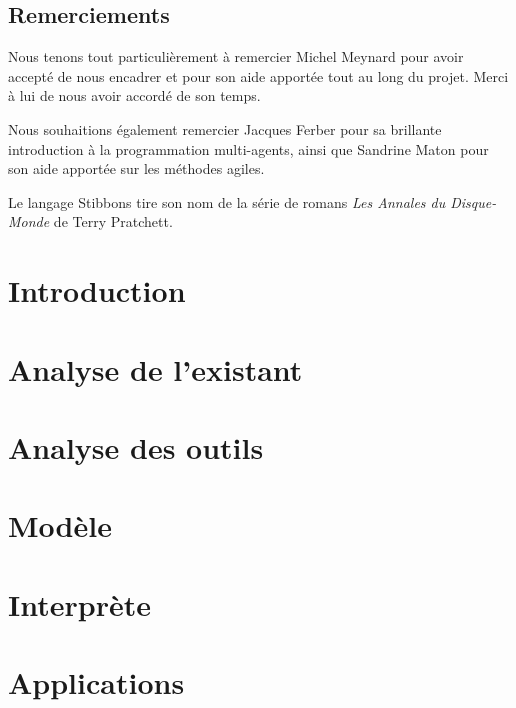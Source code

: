 \documentclass[a4paper,11pt]{report}
\newcommand{\+}{\discretionary{\mbox{\scriptsize$\hookleftarrow$}}{}{}}
\begin{document}
\section*{Remerciements}
Nous tenons tout particulièrement à remercier Michel Meynard pour avoir accepté de nous encadrer et pour son aide apportée tout au long du projet. Merci à lui de nous avoir accordé de son temps.

Nous souhaitions également remercier Jacques Ferber pour sa brillante introduction à la programmation multi-agents, ainsi que Sandrine Maton pour son aide apportée sur les méthodes agiles.

Le langage Stibbons tire son nom de la série de romans \emph{Les Annales du Disque-Monde} de Terry Pratchett.

\tableofcontents

\chapter{Introduction}


\chapter{Analyse de l'existant}




\chapter{Analyse des outils}








\chapter{Modèle}


\chapter{Interprète}


\chapter{Applications}

\end{document}
